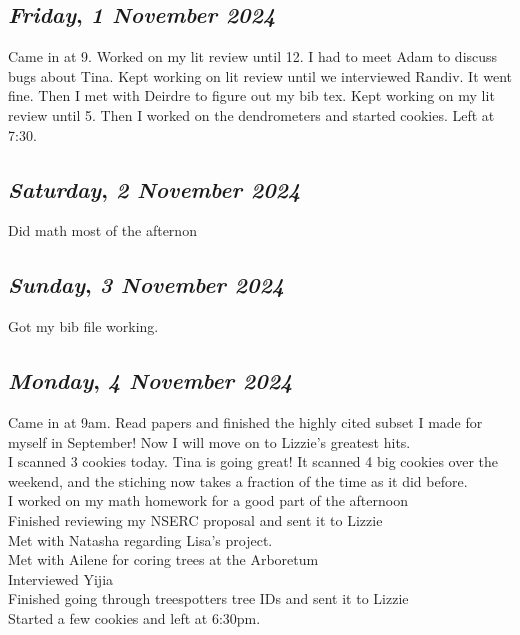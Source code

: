 \begin{center}
\section*{\month}
\end{center}

\def\day{\textit{1 November 2024}}
\def\weekday{\textit{Friday}}
\subsection*{\weekday, \day}
Came in at 9. Worked on my lit review until 12. I had to meet Adam to discuss bugs about Tina. Kept working on lit review until we interviewed Randiv. It went fine. Then I met with Deirdre to figure out my bib tex. Kept working on my lit review until 5. Then I worked on the dendrometers and started cookies. Left at 7:30.

\def\day{\textit{2 November 2024}}
\def\weekday{\textit{Saturday}}
\subsection*{\weekday, \day}
Did math most of the afternon
\def\day{\textit{3 November 2024}}
\def\weekday{\textit{Sunday}}
\subsection*{\weekday, \day}
Got my bib file working.

\def\day{\textit{4 November 2024}}
\def\weekday{\textit{Monday}}
\subsection*{\weekday, \day}
Came in at 9am. Read papers and finished the highly cited subset I made for myself in September! Now I will move on to Lizzie's greatest hits. \\
I scanned 3 cookies today. Tina is going great! It scanned 4 big cookies over the weekend, and the stiching now takes a fraction of the time as it did before. \\ 
I worked on my math homework for a good part of the afternoon\\
Finished reviewing my NSERC proposal and sent it to Lizzie\\
Met with Natasha regarding Lisa's project.\\
Met with Ailene for coring trees at the Arboretum\\
Interviewed Yijia\\
Finished going through treespotters tree IDs and sent it to Lizzie\\
Started a few cookies and left at 6:30pm.
\def\day{\textit{5 November 2024}}
\def\weekday{\textit{Tuesday}}
